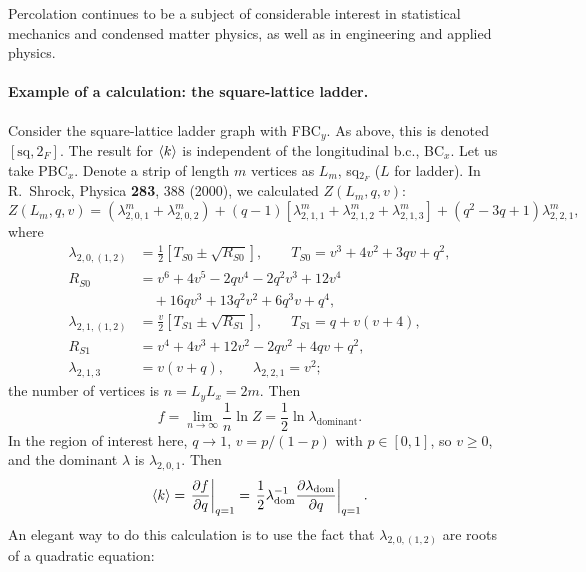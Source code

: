 Percolation continues to be a subject of considerable interest in statistical mechanics and condensed matter physics, as
well as in engineering and applied physics.

\paragraph{Example of a calculation: the square-lattice ladder.}

Consider the square-lattice ladder graph with FBC$_y$. As above, this is denoted $[\text{sq},2_F]$. The result for $\langle k\rangle$
is independent of the longitudinal b.c., BC$_x$. Let us take PBC$_x$. Denote a strip of length $m$ vertices as
$L_m$, sq$_{2_F}$ ($L$ for ladder). In R.~Shrock, Physica \textbf{283}, 388 (2000), we calculated $Z(L_m,q,v)$:
\begin{equation}
  Z(L_m,q,v) = \left(\lambda_{2,0,1}^m+\lambda_{2,0,2}^m\right) + (q-1)\left[\lambda_{2,1,1}^m+\lambda_{2,1,2}^m+\lambda_{2,1,3}^m\right]
             + (q^2-3q+1)\lambda_{2,2,1}^m,
\end{equation}
where
\begin{align}
  \lambda_{2,0,(1,2)} &= \frac{1}{2}\left[T_{S0}\pm\sqrt{R_{S0}}\right],\qquad T_{S0} = v^3+4v^2+3qv+q^2,\nonumber\\
  R_{S0} &= v^6+4v^5-2qv^4-2q^2v^3+12v^4\nonumber\\ &\quad+16qv^3+13q^2v^2+6q^3v+q^4,\nonumber\\
  \lambda_{2,1,(1,2)} &= \frac{v}{2}\left[T_{S1}\pm\sqrt{R_{S1}}\right],\qquad T_{S1} = q+v(v+4),\nonumber\\
  R_{S1} &= v^4+4v^3+12v^2-2qv^2+4qv+q^2,\nonumber\\
  \lambda_{2,1,3} &= v(v+q),\qquad \lambda_{2,2,1} = v^2;
\end{align}
the number of vertices is $n = L_yL_x = 2m$. Then
\begin{equation}
  f = \lim_{n\to\infty}\frac{1}{n}\ln Z = \frac{1}{2}\ln\lambda_{\text{dominant}} .
\end{equation}
In the region of interest here, $q\to 1$, $v = p/(1-p)$ with $p\in[0,1]$, so $v\ge 0$, and the dominant $\lambda$ is
$\lambda_{2,0,1}$. Then
\begin{equation}
  \langle k\rangle = \left.\frac{\partial f}{\partial q}\right|_{q=1} = \left.\frac{1}{2}\lambda_{\text{dom}}^{-1}\frac{\partial\lambda_{\text{dom}}}{\partial q}\right|_{q=1}.
\end{equation}
An elegant way to do this calculation is to use the fact that $\lambda_{2,0,(1,2)}$ are roots of a quadratic equation:
